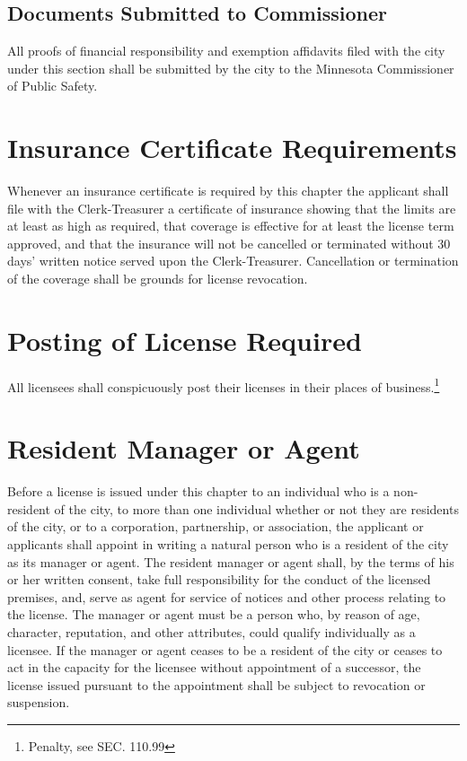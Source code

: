 \subsection{Documents Submitted to Commissioner}
All proofs of financial responsibility and exemption affidavits filed with the city under this section shall be submitted by the city to the Minnesota Commissioner of Public Safety.

\section{Insurance Certificate Requirements}
Whenever an insurance certificate is required by this chapter the applicant shall file with the Clerk-Treasurer a certificate of insurance showing that the limits are at least as high as required, that coverage is effective for at least the license term approved, and that the insurance will not be cancelled or terminated without 30 days’ written notice served upon the Clerk-Treasurer.  Cancellation or termination of the coverage shall be grounds for license revocation.

\section{Posting of License Required}
All licensees shall conspicuously post their licenses in their places of business.\footnote{Penalty, see SEC. 110.99}

\section{Resident Manager or Agent}
Before a license is issued under this chapter to an individual who is a non-resident of the city, to more than one individual whether or not they are residents of the city, or to a corporation, partnership, or association, the applicant or applicants shall appoint in writing a natural person who is a resident of the city as its manager or agent.  The resident manager or agent shall, by the terms of his or her written consent, take full responsibility for the conduct of the licensed premises, and, serve as agent for service of notices and other process relating to the license.  The manager or agent must be a person who, by reason of age, character, reputation, and other attributes, could qualify individually as a licensee.  If the manager or agent ceases to be a resident of the city or ceases to act in the capacity for the licensee without appointment of a successor, the license issued pursuant to the appointment shall be subject to revocation or suspension.

